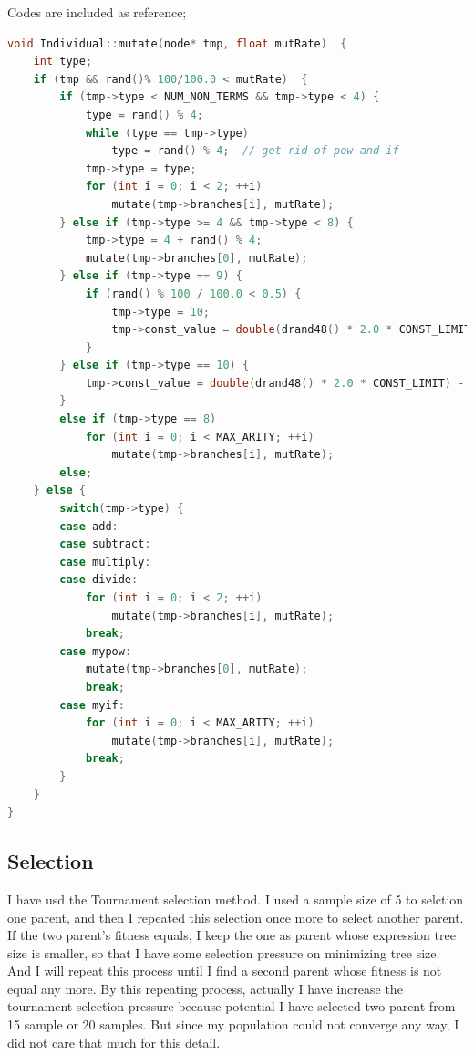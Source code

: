 \documentclass[10pt,b5paper]{article}
\begin{document}
Codes are included as reference; 
\begin{lstlisting}[language=c++]
void Individual::mutate(node* tmp, float mutRate)  {
    int type;
    if (tmp && rand()% 100/100.0 < mutRate)  {    
        if (tmp->type < NUM_NON_TERMS && tmp->type < 4) {        
            type = rand() % 4;
            while (type == tmp->type)               
                type = rand() % 4;  // get rid of pow and if
            tmp->type = type;
            for (int i = 0; i < 2; ++i)
                mutate(tmp->branches[i], mutRate);
        } else if (tmp->type >= 4 && tmp->type < 8) {        
            tmp->type = 4 + rand() % 4;
            mutate(tmp->branches[0], mutRate);
        } else if (tmp->type == 9) {        
            if (rand() % 100 / 100.0 < 0.5) {            
                tmp->type = 10;
                tmp->const_value = double(drand48() * 2.0 * CONST_LIMIT) - (CONST_LIMIT/2.0);
            }
        } else if (tmp->type == 10) {
            tmp->const_value = double(drand48() * 2.0 * CONST_LIMIT) - (CONST_LIMIT/2.0);    
        }
        else if (tmp->type == 8) 
            for (int i = 0; i < MAX_ARITY; ++i)
                mutate(tmp->branches[i], mutRate);
        else;
    } else {    
        switch(tmp->type) {        
        case add:
        case subtract:
        case multiply:
        case divide:
            for (int i = 0; i < 2; ++i)
                mutate(tmp->branches[i], mutRate);
            break;
        case mypow:
            mutate(tmp->branches[0], mutRate);
            break;
        case myif:
            for (int i = 0; i < MAX_ARITY; ++i)
                mutate(tmp->branches[i], mutRate);
            break;
        }
    }
}
\end{lstlisting}
\subsection{Selection}
\label{sec-1-4}
I have usd the Tournament selection method. I used a sample size of 5 to selction one parent, and then I repeated this selection once more to select another parent. If the two parent's fitness equals, I keep the one as parent whose expression tree size is smaller, so that I have some selection pressure on minimizing tree size. And I will repeat this process until I find a second parent whose fitness is not equal any more. By this repeating process, actually I have increase the tournament selection pressure because potential I have selected two parent from 15 sample or 20 samples. But since my population could not converge any way, I did not care that much for this detail. 
\end{document}
